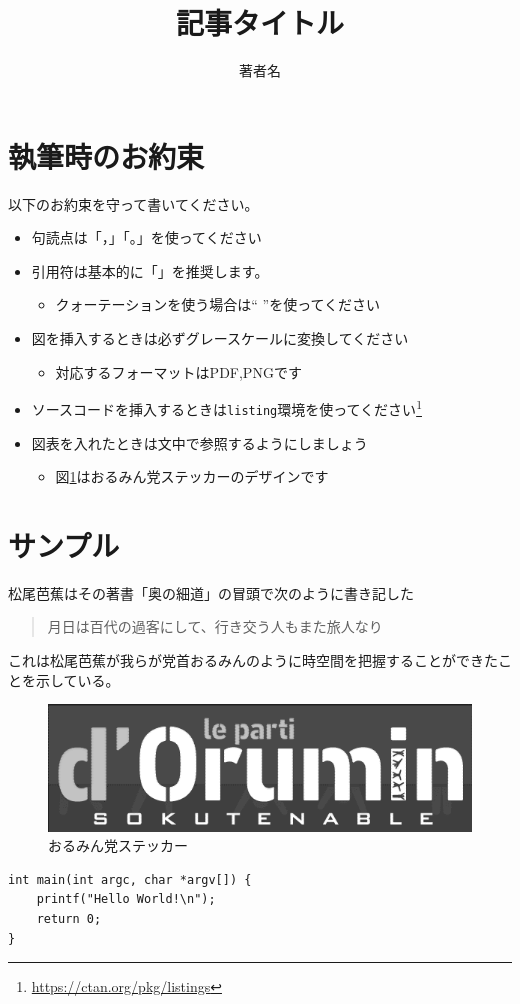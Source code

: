 \documentclass[b5j,twocolumn]{ltjsarticle}
\title{記事タイトル}
\author{著者名}
\date{}
\begin{document}
\pagestyle{empty}
\maketitle

\section{執筆時のお約束}
以下のお約束を守って書いてください。
\begin{itemize}
	\item 句読点は「，」「。」を使ってください
	\item 引用符は基本的に「」を推奨します。
	\begin{itemize}
		\item クォーテーションを使う場合は`` ''を使ってください
	\end{itemize}
	\item 図を挿入するときは必ずグレースケールに変換してください
	\begin{itemize}
		\item 対応するフォーマットはPDF,PNGです
	\end{itemize}
	\item ソースコードを挿入するときは\verb|listing|環境を使ってください\footnote{\url{https://ctan.org/pkg/listings}}
	\item 図表を入れたときは文中で参照するようにしましょう
	\begin{itemize}
		\item 図\ref{img:sample}はおるみん党ステッカーのデザインです
	\end{itemize}
\end{itemize}
\section{サンプル}
松尾芭蕉はその著書「奥の細道」の冒頭で次のように書き記した

\begin{quote}
月日は百代の過客にして、行き交う人もまた旅人なり
\end{quote}

これは松尾芭蕉が我らが党首おるみんのように時空間を把握することができたことを示している。
\begin{figure}[tb]
	\centering
	\includegraphics[width=0.8\linewidth]{images/oruminparty_sticker.png}
	\caption{おるみん党ステッカー}
	\label{img:sample}
\end{figure}

\begin{lstlisting}
int main(int argc, char *argv[]) {
	printf("Hello World!\n");
	return 0;
}
\end{lstlisting}
\end{document}

